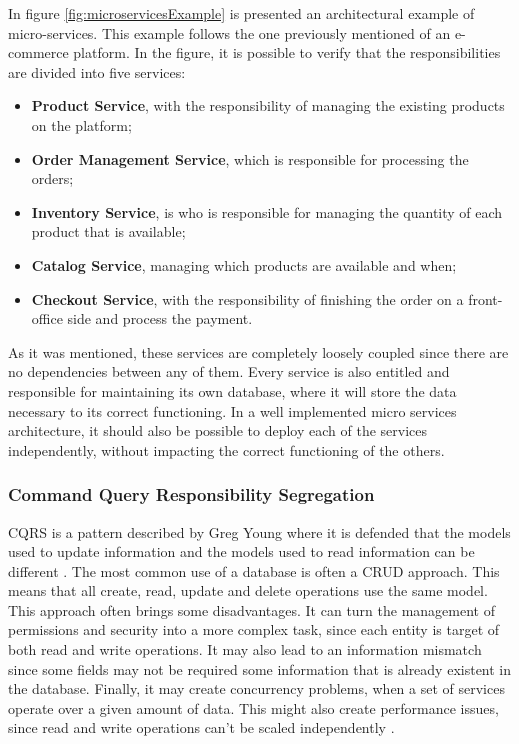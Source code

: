 \par
In figure \ref{fig:microservicesExample} is presented an architectural example of micro-services. This example follows the one previously mentioned of an e-commerce platform. In the figure, it is possible to verify that the responsibilities are divided into five services:
\begin{itemize}
  \item \textbf{Product Service}, with the responsibility of managing the existing products on the platform;
  \item \textbf{Order Management Service}, which is responsible for processing the orders;
  \item \textbf{Inventory Service}, is who is responsible for managing the quantity of each product that is available;
  \item \textbf{Catalog Service}, managing which products are available and when;
  \item \textbf{Checkout Service}, with the responsibility of finishing the order on a front-office side and process the payment.
\end{itemize}

\par 
As it was mentioned, these services are completely loosely coupled since there are no dependencies between any of them. Every service is also entitled and responsible for maintaining its own database, where it will store the data necessary to its correct functioning. In a well implemented micro services architecture, it should also be possible to deploy each of the services independently, without impacting the correct functioning of the others.


\subsubsection{Command Query Responsibility Segregation}
\label{sub:StateOfTheArt_Architecture_CQRS}
\gls{CQRS} is a pattern described by Greg Young where it is defended that the models used to update information and the models used to read information can be different \parencite{cqrs}. The most common use of a database is often a \gls{CRUD} approach. This means that all create, read, update and delete operations use the same model. This approach often brings some disadvantages. It can turn the management of permissions and security into a more complex task, since each entity is target of both read and write operations. It may also lead to an information mismatch since some fields may not be required some information that is already existent in the database. Finally, it may create concurrency problems, when a set of services operate over a given amount of data. This might also create performance issues, since read and write operations can't be scaled independently \parencite{microsoftCqrs}.
\par

